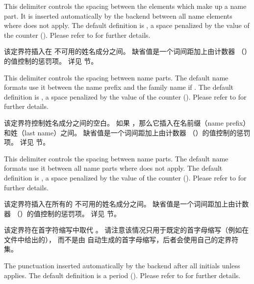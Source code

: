 \begin{ltxsyntax}
This delimiter controls the spacing between the elements which make up a name part. It is inserted automatically by the backend between all name elements where  does not apply. The default definition is , \ie a space penalized by the value of the  counter (). Please refer to  for further details.


该定界符插入在  不可用的姓名成分之间。
缺省值是一个词间距加上由计数器 （）的值控制的惩罚项。
详见  节。

This delimiter controls the spacing between name parts. The default name formats use it between the name prefix and the family name if . The default definition is , \ie a space penalized by the value of the  counter (). Please refer to  for further details.


该定界符控制姓名成分之间的空白。
如果 ，那么它插入在名前缀（name prefix）和姓（last name）之间。
缺省值是一个词间距加上由计数器 （）的值控制的惩罚项。
详见  节。

This delimiter controls the spacing between name parts. The default name formats use it between all name parts where  does not apply. The default definition is , \ie a space penalized by the value of the  counter (). Please refer to  for further details.


该定界符插入在所有的  不可用的姓名成分之间。
缺省值是一个词间距加上由计数器 （）的值控制的惩罚项。
详见  节。

该定界符在首字符缩写中取代 。
请注意该情况只用于既定的首字母缩写（例如在  文件中给出的），
而不是由 \biblatex 自动生成的首字母缩写，后者会使用自己的定界符集。

The punctuation inserted automatically by the backend after all initials unless  applies. The default definition is a period (). Please refer to  for further details.



\end{ltxsyntax}
